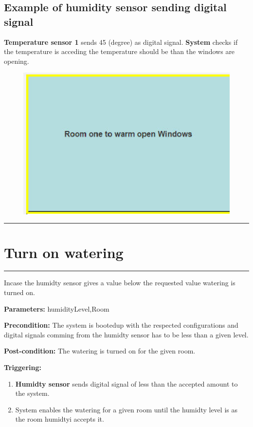 \subsection{Example of humidity sensor sending digital signal}
\textbf{Temperature sensor 1} sends 45 (degree) as digital signal.
\textbf{System} checks if the temperature is acceding the temperature should be
than the windows are opening.
\item \begin{figure}[H]
\includegraphics[width=1\textwidth]{images/OpenWindows.eps}
\end{figure}
\hfill
\vspace{0.5cm}
\hrule









\section{Turn on watering}

\hrule
\hfill
\vspace{0.5cm}
\label{operation:Turn on watering}

Incase the humidty sensor gives a value below the requested value watering is
turned on.
\begin{description}
\item \textbf{Parameters:} humidityLevel,Room
\item \textbf{Precondition:} The system is bootedup with the respected
configurations and digital signals comming from the humidty sensor has to be
less than a given level.
\item \textbf{Post-condition:} The watering is turned on for the given room.

\item \textbf{Triggering:}
\begin{enumerate}
\item \textbf{Humidty sensor} sends digital signal of less than the accepted
amount to the system.
\item System enables the watering for a given room until the humidty level is
as the room humidtyi accepts it.
\end{enumerate}
\end{description}

